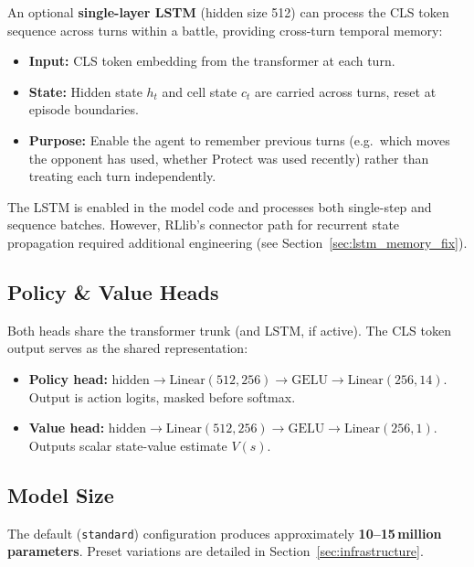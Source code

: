 An optional \textbf{single-layer LSTM} (hidden size 512) can process the CLS
token sequence across turns within a battle, providing cross-turn temporal
memory:

\begin{itemize}
  \item \textbf{Input:} CLS token embedding from the transformer at each turn.
  \item \textbf{State:} Hidden state $h_t$ and cell state $c_t$ are carried
        across turns, reset at episode boundaries.
  \item \textbf{Purpose:} Enable the agent to remember previous turns (e.g.\
        which moves the opponent has used, whether Protect was used recently)
        rather than treating each turn independently.
\end{itemize}

The LSTM is enabled in the model code and processes both single-step and
sequence batches.  However, RLlib's connector path for recurrent state
propagation required additional engineering (see
Section~\ref{sec:lstm_memory_fix}).

\subsection{Policy \& Value Heads}

Both heads share the transformer trunk (and LSTM, if active).  The CLS token
output serves as the shared representation:

\begin{itemize}
  \item \textbf{Policy head:} $\text{hidden} \to \text{Linear}(512, 256) \to
        \text{GELU} \to \text{Linear}(256, 14)$.  Output is action logits,
        masked before softmax.
  \item \textbf{Value head:} $\text{hidden} \to \text{Linear}(512, 256) \to
        \text{GELU} \to \text{Linear}(256, 1)$.  Outputs scalar state-value
        estimate $V(s)$.
\end{itemize}

\subsection{Model Size}

The default (\texttt{standard}) configuration produces approximately
\textbf{10--15\,million parameters}.  Preset variations are detailed in
Section~\ref{sec:infrastructure}.


